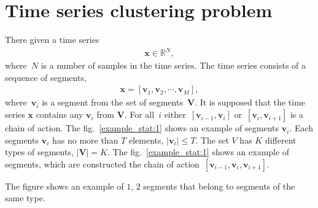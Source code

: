\documentclass[12pt, twoside]{article}
\numberwithin{equation}{section}
\begin{document}
\section{Time series clustering problem}

There given a time series
\begin{equation}
\label{eq:st:1}
\begin{aligned}
\textbf{x} \in \mathbb{R}^{N},
\end{aligned}
\end{equation}
where~$N$ is a number of samples in the time series. The time series consists of a sequence of segments,
\begin{equation}
\label{eq:st:2}
\begin{aligned}
\textbf{x} = [\textbf{v}_1, \textbf{v}_2, \cdots, \textbf{v}_M],
\end{aligned}
\end{equation}
where~$\textbf{v}_i$ is a segment from the set of segments~$\mathbf{V}$. It is supposed that the time series $\textbf{x}$ contains any $\textbf{v}_i$ from $\textbf{V}$.
For all~$i$ either~$[\textbf{v}_{i-1},\textbf{v}_{i}]$ or~$[\textbf{v}_{i},\textbf{v}_{i+1}]$  is a  chain of action. The fig.~\ref{example_stat:1} shows an example of segments $\textbf{v}_i$.
Each segments $\textbf{v}_{i}$ has no more than $T$ elements, $\left|\textbf{v}_{i}\right| \leq T$. The set $V$ has $K$ different types of segments, $\left|\mathbf{V}\right| = K$. The fig.~\ref{example_stat:1} shows an example of segments, which are constructed the chain of action~$[\textbf{v}_{i-1}, \textbf{v}_{i}, \textbf{v}_{i+1}]$.

The figure shows an example of $ 1 $, $ 2 $ segments that belong to segments of the same type.


\end{document}

